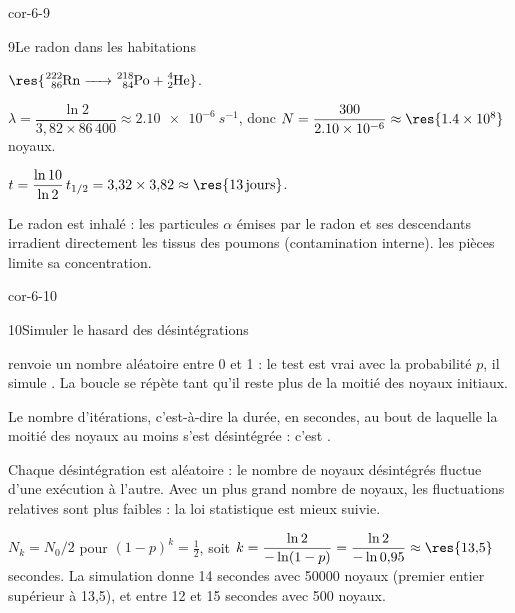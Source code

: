\begin{blocLivre}{cor-6-9}
\begin{corrige}{9}{Le radon dans les habitations}
\begin{questions}
\item $\res{\ce{^{222}_{86}Rn -> ^{218}_{84}Po + ^{4}_{2}He}}$.
\item $\lambda=\dfrac{\ln2}{3{,}82\times86\,400}\approx\qty{2,10e-6}{s^{-1}}$, donc $N=\dfrac{300}{\num{2.10e-6}}\approx\res{\num{1.4e8}}$ noyaux.
\item $t=\dfrac{\ln10}{\ln2}\,t_{1/2}=3{,}32\times3{,}82\approx\res{\qty{13}{jours}}$.
\item Le radon est inhalé : les particules $\alpha$ émises par le radon et ses descendants irradient directement les
tissus des poumons (contamination interne).  les pièces limite sa concentration.
\end{questions}
\end{corrige}
\end{blocLivre}
\begin{blocLivre}{cor-6-10}
\begin{corrige}{10}{Simuler le hasard des désintégrations}
\begin{questions}
\item {} renvoie un nombre aléatoire entre 0 et 1 : le test est vrai avec la probabilité $p$, il
simule . La boucle se répète tant qu'il reste plus de la
moitié des noyaux initiaux.
\item Le nombre d'itérations, c'est-à-dire la durée, en secondes, au bout de laquelle la moitié des noyaux au moins
s'est désintégrée : c'est .
\item Chaque désintégration est aléatoire : le nombre de noyaux désintégrés fluctue d'une exécution à l'autre. Avec
un plus grand nombre de noyaux, les fluctuations relatives sont plus faibles : la loi statistique est mieux suivie.
\item $N_k=N_0/2$ pour $(1-p)^k=\frac12$, soit $k=\dfrac{\ln2}{-\ln(1-p)}=\dfrac{\ln2}{-\ln0{,}95}\approx\res{13{,}5}$ secondes.
La simulation donne 14 secondes avec \num{50000} noyaux (premier entier supérieur à 13,5), et entre 12 et 15 secondes
avec 500 noyaux.
\end{questions}
\end{corrige}
\end{blocLivre}
